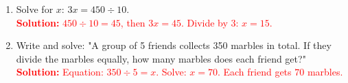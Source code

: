 \documentclass[12pt]{article}
\begin{document}
\begin{tcolorbox}[colframe=black!60, colback=white, 
coltitle=black, colbacktitle=black!15, fonttitle=\bfseries\Large, 
title=Exercises, halign title=center, left=10pt, right=10pt, top=10pt, bottom=60pt]
\begin{enumerate}[itemsep=3em]
    \item Solve for \( x \): \( 3x = 450 \div 10 \).\\
    \textcolor{red}{\textbf{Solution:} 
    \( 450 \div 10 = 45 \), then \( 3x = 45 \). 
    Divide by 3: \( x = 15 \).}

    \item Write and solve: "A group of 5 friends collects 350 marbles in total. If they divide the marbles equally, how many marbles does each friend get?"\\
    \textcolor{red}{\textbf{Solution:} 
    Equation: \( 350 \div 5 = x \). 
    Solve: \( x = 70 \). Each friend gets \( 70 \) marbles.}
\end{enumerate}
\end{tcolorbox}

\vspace{1em}
\end{document}
